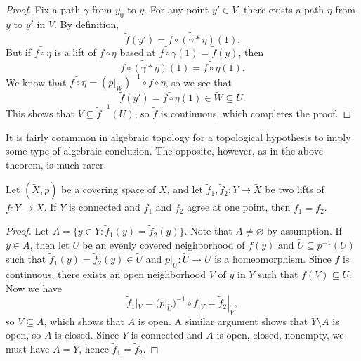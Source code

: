 \begin{proof}
  Fix a path $\gamma$ from $y_0$ to $y$. For any
  point $y' \in V$, there exists a path $\eta$ from $y$
  to $y'$ in $V$. By definition,
  \[
    \widetilde{f}(y') = \widetilde{f \circ (\gamma * \eta)}(1).
  \]
  But if $\widetilde{f \circ \eta}$ is a lift of
  $f \circ \eta$ based at
  $\widetilde{f \circ \gamma}(1) = \widetilde{f}(y)$, then
  \[
    \widetilde{f \circ (\gamma * \eta)}(1)
    = \widetilde{f \circ \eta}(1).
  \]
  We know that $\widetilde{f \circ \eta} = (p|_{\widetilde{W}})^{-1} \circ f \circ \eta$, so we see that
  \[
    \widetilde{f}(y') = \widetilde{f \circ \eta}(1)
    \in \widetilde{W} \subseteq U.
  \]
  This shows that $V \subseteq \widetilde{f}^{-1}(U)$, so
  $\widetilde{f}$ is continuous, which completes the proof.
\end{proof}

\begin{remark}
  It is fairly commmon in algebraic topology for a topological
  hypothesis to imply some type of algebraic conclusion.
  The opposite, however, as in the above theorem, is much rarer.
\end{remark}

\begin{lemma}\label{lem:lemma-24}
  Let $(\widetilde{X}, p)$ be a covering space of $X$, and
  let $\widetilde{f}_1, \widetilde{f}_2 : Y \to \widetilde{X}$
  be two lifts of $f : Y \to X$. If $Y$ is connected and
  $\widetilde{f}_1$ and $\widetilde{f}_2$ agree at one
  point, then $\widetilde{f}_1 = \widetilde{f}_2$.
\end{lemma}

\begin{proof}
  Let $A = \{y \in Y : \widetilde{f}_1(y) = \widetilde{f}_2(y)\}$.
  Note that $A \ne \varnothing$ by assumption. If
  $y \in A$, then let $U$ be an evenly covered neighborhood
  of $f(y)$ and $\widetilde{U} \subseteq p^{-1}(U)$ such that
  $\widetilde{f}_1(y) = \widetilde{f}_2(y) \in \widetilde{U}$
  and $p|_{\widetilde{U}} : \widetilde{U} \to U$ is a homeomorphism.
  Since $f$ is continuous, there exists an open neighborhood
  $V$ of $y$ in $Y$ such that $f(V) \subseteq U$. Now we have
  \[
    \widetilde{f}_1|_V = (p|_{\widetilde{U}})^{-1} \circ f|_V
    = \widetilde{f}_2|_V,
  \]
  so $V \subseteq A$, which shows that $A$ is open.
  A similar argument shows that $Y \setminus A$ is open,
  so $A$ is closed. Since $Y$ is connected and
  $A$ is open, closed, nonempty, we must have
  $A = Y$, hence $\widetilde{f}_1 = \widetilde{f}_2$.
\end{proof}

